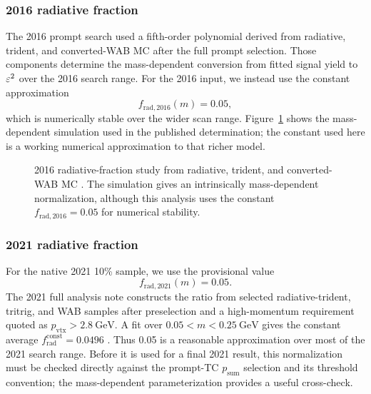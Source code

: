 \subsubsection{2016 radiative fraction}

The 2016 prompt search used a fifth-order polynomial derived from radiative, trident,
and converted-WAB MC after the full prompt selection. Those components determine the
mass-dependent conversion from fitted signal yield to $\varepsilon^2$ over the 2016 search
range. For the 2016 input, we instead use the constant approximation
\begin{equation}
f_{\mathrm{rad},2016}(m) = 0.05,
\end{equation}
which is numerically stable over the wider scan range. Figure~\ref{fig:2016-radfrac}
shows the mass-dependent simulation used in the published determination; the constant
used here is a working numerical approximation to that richer model.

\begin{figure}[H]
\centering
{}
\caption{2016 radiative-fraction study from radiative, trident, and converted-WAB MC
\cite{HPS2016BumpInternal}. The simulation gives an intrinsically mass-dependent
normalization, although this analysis uses the constant
$f_{\mathrm{rad},2016}=0.05$ for numerical stability.}
\label{fig:2016-radfrac}
\end{figure}

\subsubsection{2021 radiative fraction}

For the native 2021 10\% sample, we use the provisional value
\begin{equation}
f_{\mathrm{rad},2021}(m) = 0.05.
\end{equation}
The 2021 full analysis note constructs the ratio from selected radiative-trident,
tritrig, and WAB samples after preselection and a high-momentum requirement quoted as
$p_{\mathrm{vtx}}>2.8~\mathrm{GeV}$. A fit over
$0.05<m<0.25~\mathrm{GeV}$ gives the constant average
$f_{\mathrm{rad}}^{\mathrm{const}}=0.0496$ \cite[Sec.~6.1, Figs.~92--93,
Eqs.~25--26]{HPS2021FullAnalysisNote}. Thus 0.05 is a reasonable approximation over
most of the 2021 search range. Before it is used for a final 2021 result, this
normalization must be checked directly against the prompt-TC $p_{\mathrm{sum}}$
selection and its threshold convention; the mass-dependent parameterization provides a
useful cross-check.

